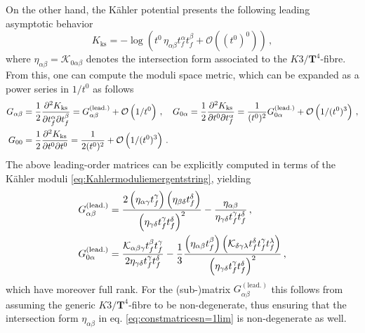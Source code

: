 On the other hand, the K\"ahler potential presents the following leading asymptotic behavior \cite{Lee:2019wij}
%
\begin{equation}\label{eq:kahlerpotn=1}
	K_{\text{ks}}= - \log \left(t^0\, \eta_{\alpha \beta} t_f^{\alpha} t_f^{\beta} + \mathcal{O} \left((t^0)^0\right)\right)\, ,
\end{equation}
%
where $\eta_{\alpha \beta} = \mathcal{K}_{0 \alpha \beta}$ denotes the intersection form associated to the $K3/\mathbf{T}^4$-fibre. From this, one can compute the moduli space metric, which can be expanded as a power series in $1/t^0$ as follows
%
\begin{align}\label{eq:metricn=1}
	G_{\alpha \beta} &= \frac{1}{2} \frac{\partial^2 K_{\text{ks}}}{\partial t_f^{\alpha} \partial t_f^{\beta}} = G^{(\rm lead.)}_{\alpha \beta} + \mathcal{O}\left(1/t^0\right)\, , \quad G_{0 \alpha} = \frac{1}{2} \frac{\partial^2 K_{\text{ks}}}{\partial t^0 \partial t_f^{\alpha}} = \frac{1}{(t^0)^2} G^{(\rm lead.)}_{0 \alpha} + \mathcal{O}\left(1/(t^0)^3\right)\, ,\notag\\
	G_{0 0} &= \frac{1}{2} \frac{\partial^2 K_{\text{ks}}}{\partial t^0 \partial t^0} = \frac{1}{2(t^0)^2} + \mathcal{O}\left(1/(t^0)^3\right)\, .
\end{align}
%
The above leading-order matrices can be explicitly computed in terms of the K\"ahler moduli \eqref{eq:Kahlermoduliemergentstring}, yielding 
%
\begin{align}\label{eq:constmatricesn=1lim}
	\notag G^{(\text{lead.})}_{\alpha \beta} &=\frac{2 \left(\eta_{\alpha \gamma} t_f^{\gamma}\right) \left(\eta_{\beta \delta} t_f^{\delta}\right)}{\left( \eta_{\gamma \delta} t^{\gamma}_f t^{\delta}_f \right)^2} - \frac{\eta_{\alpha \beta}}{\eta_{\gamma \delta} t^{\gamma}_f t^{\delta}_f}\, ,\\
    G^{(\text{lead.})}_{0 \alpha} &=\frac{\mathcal{K}_{\alpha \beta \gamma} t^{\beta}_f t^{\gamma}_f}{2 \eta_{\gamma \delta} t^{\gamma}_f t^{\delta}_f} - \frac{1}{3}\frac{\left( \eta_{\alpha \beta} t_f^{\beta}\right) \left( \mathcal{K}_{\delta \gamma \lambda} t^{\delta}_f t^{\gamma}_f t^{\lambda}_f\right)}{\left( \eta_{\gamma \delta} t^{\gamma}_f t^{\delta}_f \right)^2}\, ,
\end{align}
%
which have moreover full rank. For the (sub-)matrix $G^{(\text{lead.})}_{\alpha \beta}$ this follows from assuming the generic $K3/\mathbf{T}^4$-fibre to be non-degenerate, thus ensuring that the intersection form $\eta_{\alpha \beta}$ in eq. \eqref{eq:constmatricesn=1lim} is non-degenerate as well.
	
